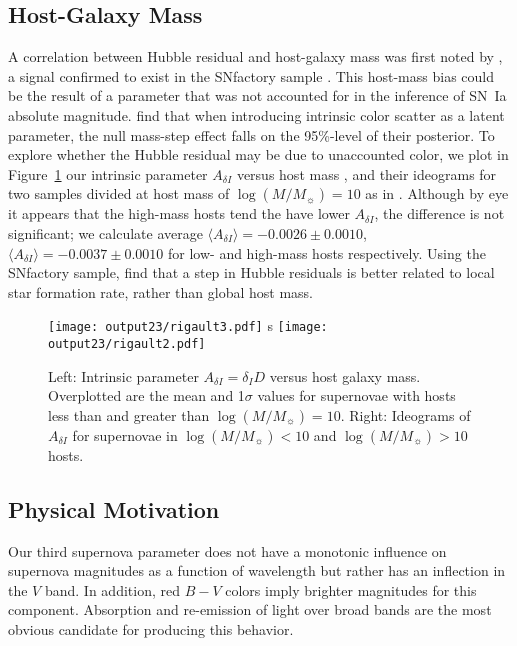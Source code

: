 \documentclass{aastex61}   	%
\begin{document}
\subsection{Host-Galaxy Mass}
A correlation between Hubble residual and host-galaxy mass
was first noted by \citet{2010ApJ...715..743K,2010MNRAS.406..782S}, a signal confirmed to exist in the SNfactory
sample \citep{2013ApJ...770..108C}.
This host-mass bias could be the result of a parameter that was not accounted for in the inference of SN~Ia absolute magnitude.
\citet{2016arXiv160904470M} find that when introducing intrinsic color scatter as a latent parameter, the null mass-step effect falls on the 95\%-level of their posterior.
To explore whether the Hubble residual may be due to unaccounted color,
we plot in Figure~\ref{childress:fig} our intrinsic parameter  $A_{\delta I}$  versus host mass 
\citep{2016rigault}, and their ideograms for two samples divided at host mass of  $\log{(M/M_\sun)}=10$
as in  \citet{2013ApJ...770..108C}.
Although by eye it appears that the high-mass hosts tend the have lower $A_{\delta I}$, the difference is
not significant; we calculate  average
$\langle A_{\delta I} \rangle=    -0.0026 \pm    0.0010$,
$\langle A_{\delta I} \rangle=  -0.0037 \pm    0.0010 $ 
for low- and high-mass hosts respectively. 
Using the SNfactory sample,
\citet{2013A&A...560A..66R,2017Rigault} find that a step in Hubble residuals is better related to local star formation rate, rather than
global host mass.

\begin{figure}[htbp] %
   \centering
   \texttt{[image: output23/rigault3.pdf]}
s     \texttt{[image: output23/rigault2.pdf]}
      \caption{Left: Intrinsic parameter $A_{\delta I}=\delta_I D$  versus host galaxy mass. Overplotted are the mean and 1$\sigma$ values for supernovae with hosts
      less than and greater than  $\log{(M/M_\sun)}=10$.
Right: Ideograms of  $A_{\delta I}$ for supernovae in $\log{(M/M_\sun)}<10$ and $\log{(M/M_\sun)}>10$ hosts. 
   \label{childress:fig}}
\end{figure}


\subsection{Physical Motivation}

Our third supernova parameter does not have a monotonic influence on supernova magnitudes as a function
of wavelength but rather has an inflection in the $V$ band.  In addition, red $B-V$ colors imply brighter magnitudes
for this component.  Absorption and re-emission of light
over broad bands are the most obvious candidate for producing this behavior.
\end{document}
